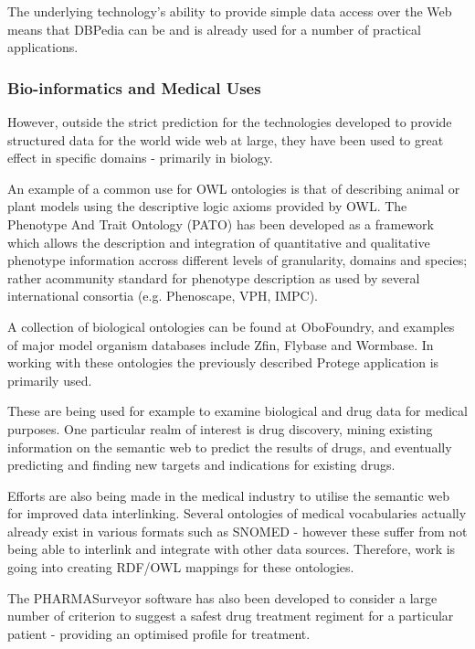 \documentclass{article}
\begin{document}
The underlying technology's ability to provide simple data access over the Web
means that DBPedia can be and is already used for a number of practical
applications.\cite{dbpedia-uses}

\subsubsection{Bio-informatics and Medical Uses}

However, outside the strict prediction for the technologies developed to provide
structured data for the world wide web at large, they have been used to great
effect in specific domains - primarily in biology.

An example of a common use for OWL ontologies is that of describing animal or
plant models using the descriptive logic axioms provided by OWL. The Phenotype
And Trait Ontology (PATO) has been developed as a framework which allows the
description and integration of quantitative and qualitative phenotype
information accross different levels of granularity, domains and
species\cite{pato}; rather acommunity standard for phenotype description as
used by several international consortia (e.g. Phenoscape\cite{phenoscape},
VPH\cite{vph}, IMPC\cite{impc}).

A collection of biological ontologies can be found at
OboFoundry\cite{obofoundry}, and examples of major model organism databases
include Zfin\cite{zfin}, Flybase\cite{flybase} and Wormbase\cite{wormbase}. In working with
these ontologies the previously described Protege application is primarily used. 

These are being used for example to examine biological and drug data for medical
purposes\cite{humontology}. One particular realm of interest is drug discovery,
mining existing information on the semantic web to predict the results of drugs,
and eventually predicting and finding new targets and indications for existing
drugs\cite{semwebdiscovery}.

Efforts are also being made in the medical industry to utilise the semantic web
for improved data interlinking. Several ontologies of medical vocabularies actually
already exist in various formats such as SNOMED - however these suffer from not
being able to interlink and integrate with other data sources. Therefore, work
is going into creating RDF/OWL mappings for these ontologies. 

The PHARMASurveyor software has also been developed to consider a large number
of criterion to suggest a safest drug treatment regiment for a particular
patient - providing an optimised profile for treatment.\cite{psurveyor} 
\end{document}
